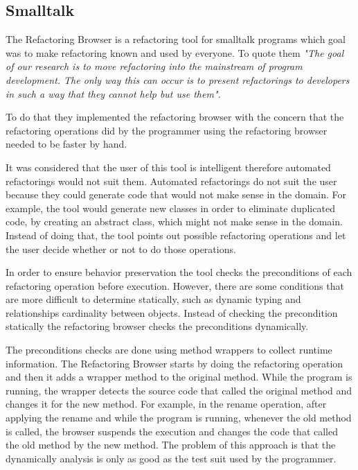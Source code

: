 





\subsection{Smalltalk}%

The Refactoring Browser \cite{roberts1997refactoring} is a refactoring tool for smalltalk programs which goal was to make refactoring known and used by everyone.
To quote them  \textit{"The goal of our research is to move refactoring into the mainstream of program development. The only way this can occur is to present refactorings to developers in such a way that they cannot help but use them".} 

To do that they implemented the refactoring browser with the concern that the refactoring operations did by the programmer using the refactoring browser needed to be faster by hand.

It was considered that the user of this tool is intelligent therefore automated refactorings would not suit them. 
Automated refactorings do not suit the user because they could generate code that would not make sense in the domain.
For example, the tool would generate new classes in order to eliminate duplicated code, by creating an abstract class, which might not make sense in the domain. Instead of doing that, the tool points out possible refactoring operations and let the user decide whether or not to do those operations.

In order to ensure behavior preservation the tool checks the preconditions of each refactoring operation before execution. 
However, there are some conditions that are more difficult to determine statically, such as dynamic typing and relationships cardinality between objects. 
Instead of checking the precondition statically the refactoring browser checks the preconditions dynamically. 

The preconditions checks are done using method wrappers to collect runtime information. 
The Refactoring Browser starts by doing the refactoring operation and then it adds a wrapper method to the original method. 
While the program is running, the wrapper detects the source code that called the original method and changes it for the new method.
For example, in the rename operation, after applying the rename and while the program is running, whenever the old method is called, the browser suspends the execution and changes the code that called the old method by the new method. 
The problem of this approach is that the dynamically analysis is only as good as the test suit used by the programmer.



